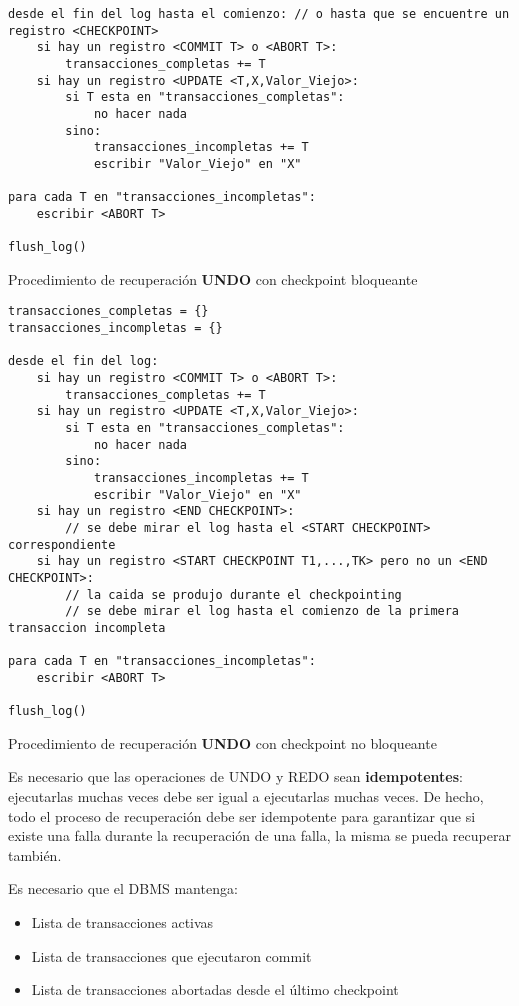\documentclass[a4paper, twoside]{article}
\begin{document}
\begin{itemize}
\begin{itemize}
\begin{enumerate}
\begin{algorithm}[H]
\begin{lstlisting}
desde el fin del log hasta el comienzo: // o hasta que se encuentre un registro <CHECKPOINT>
	si hay un registro <COMMIT T> o <ABORT T>:
		transacciones_completas += T
	si hay un registro <UPDATE <T,X,Valor_Viejo>:
		si T esta en "transacciones_completas":
			no hacer nada
		sino:
			transacciones_incompletas += T
			escribir "Valor_Viejo" en "X"

para cada T en "transacciones_incompletas":
	escribir <ABORT T>

flush_log()
				\end{lstlisting}
				\caption{Procedimiento de recuperación \textbf{UNDO }con checkpoint bloqueante}
			\end{algorithm}

			\begin{algorithm}[H]
				\begin{lstlisting}
transacciones_completas = {}
transacciones_incompletas = {}

desde el fin del log: 
	si hay un registro <COMMIT T> o <ABORT T>:
		transacciones_completas += T
	si hay un registro <UPDATE <T,X,Valor_Viejo>:
		si T esta en "transacciones_completas":
			no hacer nada
		sino:
			transacciones_incompletas += T
			escribir "Valor_Viejo" en "X"
	si hay un registro <END CHECKPOINT>:
		// se debe mirar el log hasta el <START CHECKPOINT> correspondiente
	si hay un registro <START CHECKPOINT T1,...,TK> pero no un <END CHECKPOINT>:
		// la caida se produjo durante el checkpointing
		// se debe mirar el log hasta el comienzo de la primera transaccion incompleta

para cada T en "transacciones_incompletas":
	escribir <ABORT T>

flush_log()
				\end{lstlisting}
				\caption{Procedimiento de recuperación \textbf{UNDO }con checkpoint no bloqueante}
			\end{algorithm}
		\end{enumerate}
	\end{itemize}
\end{itemize}

Es necesario que las operaciones de UNDO y REDO sean \textbf{idempotentes}: ejecutarlas muchas veces debe ser igual a ejecutarlas muchas veces. De hecho, todo el proceso de recuperación debe ser idempotente para garantizar que si existe una falla durante la recuperación de una falla, la misma se pueda recuperar también.

Es necesario que el DBMS mantenga:
\begin{itemize}
	\item Lista de transacciones activas
	\item Lista de transacciones que ejecutaron commit
	\item Lista de transacciones abortadas desde el último checkpoint
\end{itemize}
\end{document}
